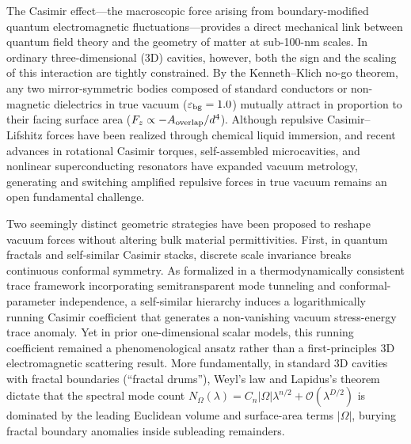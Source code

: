 \documentclass[pdflatex,sn-nature]{sn-jnl}
\begin{document}
\maketitle

The Casimir effect---the macroscopic force arising from boundary-modified quantum electromagnetic fluctuations\cite{casimir1948,bordag2009}---provides a direct mechanical link between quantum field theory and the geometry of matter at sub-100-nm scales. In ordinary three-dimensional (3D) cavities, however, both the sign and the scaling of this interaction are tightly constrained. By the Kenneth--Klich no-go theorem\cite{kennethklich2006}, any two mirror-symmetric bodies composed of standard conductors or non-magnetic dielectrics in true vacuum ($\varepsilon_{\rm bg}=1.0$) mutually attract in proportion to their facing surface area ($F_z \propto -A_{\rm overlap}/d^4$). Although repulsive Casimir--Lifshitz forces have been realized through chemical liquid immersion\cite{munday2009}, and recent advances in rotational Casimir torques\cite{somers2018}, self-assembled microcavities\cite{munkhbat2021}, and nonlinear superconducting resonators\cite{casimir_drum2025,dejong2026} have expanded vacuum metrology, generating and switching amplified repulsive forces in true vacuum remains an open fundamental challenge\cite{rodriguez2011}.

Two seemingly distinct geometric strategies have been proposed to reshape vacuum forces without altering bulk material permittivities. First, in quantum fractals\cite{kempkes2019,xu2021} and self-similar Casimir stacks\cite{akkermans2010,shajesh2016,shajesh2017}, discrete scale invariance breaks continuous conformal symmetry. As formalized in a thermodynamically consistent trace framework incorporating semitransparent mode tunneling and conformal-parameter independence\cite{milton2004,milton2016,gordon2026prd}, a self-similar hierarchy induces a logarithmically running Casimir coefficient that generates a non-vanishing vacuum stress-energy trace anomaly. Yet in prior one-dimensional scalar models\cite{gordon2026prd}, this running coefficient remained a phenomenological ansatz rather than a first-principles 3D electromagnetic scattering result. More fundamentally, in standard 3D cavities with fractal boundaries (``fractal drums''), Weyl's law and Lapidus's theorem\cite{lapidus1991} dictate that the spectral mode count $N_\Omega(\lambda) = C_n |\Omega|\lambda^{n/2} + \mathcal{O}(\lambda^{D/2})$ is dominated by the leading Euclidean volume and surface-area terms $|\Omega|$, burying fractal boundary anomalies inside subleading remainders.
\end{document}
